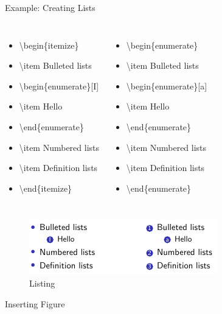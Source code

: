 \documentclass[11pt]{beamer}
\begin{document}
	\begin{frame}{Example: Creating Lists}
		\begin{columns}
			\begin{itemize}
				\item[] \textbackslash begin\{itemize\}
				\item[] \textbackslash item Bulleted lists
				\item[] \textbackslash begin\{enumerate\}[I]
				\item[] \textbackslash item Hello
				\item[] \textbackslash end\{enumerate\} 
				\item[] \textbackslash item Numbered lists
				\item[] \textbackslash item Definition lists
				\item[] \textbackslash end\{itemize\}
			\end{itemize}	
			\begin{itemize}
				\item[] \textbackslash begin\{enumerate\}
				\item[] \textbackslash item Bulleted lists
				\item[] \textbackslash begin\{enumerate\}[a]
				\item[] \textbackslash item Hello
				\item[] \textbackslash end\{enumerate\} 
				\item[] \textbackslash item Numbered lists
				\item[] \textbackslash item Definition lists
				\item[] \textbackslash end\{enumerate\}
			\end{itemize}	
		\end{columns}		
		\begin{figure}
			\centering
			\includegraphics[width=0.7\linewidth]{Images/Lisiting}
			\caption{Listing}
			\label{fig:listing}
		\end{figure}
	\end{frame}
	\begin{frame}{}
		\begin{center}
			\huge {Inserting Figure}
		\end{center}	
	\end{frame}
\end{document}

